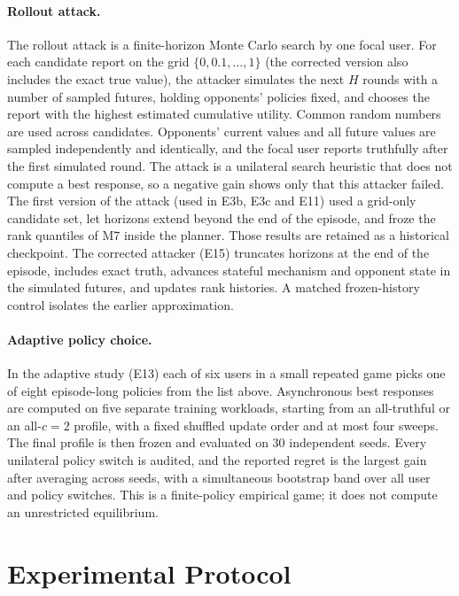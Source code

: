 \documentclass{article}
\theoremstyle{plain}
\theoremstyle{definition}
\begin{document}
\paragraph{Rollout attack.}
The rollout attack is a finite-horizon Monte Carlo search by one focal user.
For each candidate report on the grid $\{0,0.1,\dots,1\}$ (the corrected version also includes the exact true value), the attacker simulates the next $H$ rounds with a number of sampled futures, holding opponents' policies fixed, and chooses the report with the highest estimated cumulative utility.
Common random numbers are used across candidates.
Opponents' current values and all future values are sampled independently and identically, and the focal user reports truthfully after the first simulated round.
The attack is a unilateral search heuristic that does not compute a best response, so a negative gain shows only that this attacker failed.
The first version of the attack (used in E3b, E3c and E11) used a grid-only candidate set, let horizons extend beyond the end of the episode, and froze the rank quantiles of M7 inside the planner.
Those results are retained as a historical checkpoint.
The corrected attacker (E15) truncates horizons at the end of the episode, includes exact truth, advances stateful mechanism and opponent state in the simulated futures, and updates rank histories.
A matched frozen-history control isolates the earlier approximation.

\paragraph{Adaptive policy choice.}
In the adaptive study (E13) each of six users in a small repeated game picks one of eight episode-long policies from the list above.
Asynchronous best responses are computed on five separate training workloads, starting from an all-truthful or an all-$c{=}2$ profile, with a fixed shuffled update order and at most four sweeps.
The final profile is then frozen and evaluated on 30 independent seeds.
Every unilateral policy switch is audited, and the reported regret is the largest gain after averaging across seeds, with a simultaneous bootstrap band over all user and policy switches.
This is a finite-policy empirical game; it does not compute an unrestricted equilibrium.

\section{Experimental Protocol}
\label{sec:protocol}
\end{document}
